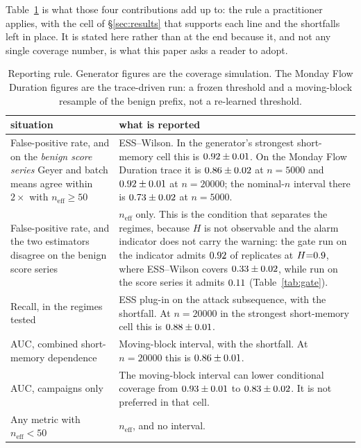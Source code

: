 \documentclass[a4paper,fleqn]{cas-dc}
\newcommand{\neff}{n_{\mathrm{eff}}}
\newcommand{\tabwidth}{\columnwidth}
\newcommand{\tabbody}{\small\setlength{\tabcolsep}{3.5pt}\renewcommand{\arraystretch}{1.08}}
\newcommand{\fulltab}{\renewcommand{\tabwidth}{\textwidth}\tabbody}
\begin{document}
Table~\ref{tab:rule} is what those four contributions add up to: the rule a practitioner
applies, with the cell of \S\ref{sec:results} that supports each line and the shortfalls
left in place. It is stated here rather than at the end because it, and not any single
coverage number, is what this paper asks a reader to adopt.

\begin{table}[!t]
\centering
\caption{Reporting rule. Generator figures are the coverage simulation. The Monday Flow Duration figures are the trace-driven run: a frozen threshold and a moving-block resample of the benign prefix, not a re-learned threshold.}\label{tab:rule}
\fulltab
\begin{tabularx}{\textwidth}{@{}>{\raggedright\arraybackslash}p{}>{\raggedright\arraybackslash}X@{}}
\toprule
situation & what is reported\\
\midrule
False-positive rate, and on the \emph{benign score series} Geyer and batch means agree within
$2\times$ with $\neff\ge50$ &
ESS--Wilson. In the generator's strongest short-memory cell this is $0.92\pm0.01$. On the Monday Flow Duration trace it is $0.86\pm0.02$ at $n{=}5000$ and $0.92\pm0.01$ at $n{=}20000$; the nominal-$n$ interval there is $0.73\pm0.02$ at $n{=}5000$.\\
False-positive rate, and the two estimators disagree on the benign score series &
$\neff$ only. This is the condition that separates the regimes, because $H$ is not observable and
the alarm indicator does not carry the warning: the gate run on the indicator admits
$0.92$ of replicates at $H{=}0.9$, where ESS--Wilson covers $0.33\pm0.02$, while run
on the score series it admits $0.11$ (Table~\ref{tab:gate}).\\
Recall, in the regimes tested &
ESS plug-in on the attack subsequence, with the shortfall. At $n{=}20000$ in the strongest short-memory cell this is $0.88\pm0.01$.\\
AUC, combined short-memory dependence &
Moving-block interval, with the shortfall. At $n{=}20000$ this is $0.86\pm0.01$.\\
AUC, campaigns only &
The moving-block interval can lower conditional coverage from $0.93\pm0.01$ to $0.83\pm0.02$. It is not preferred in that cell.\\
Any metric with $\neff<50$ &
$\neff$, and no interval.\\
\bottomrule
\end{tabularx}
\end{table}
\end{document}
